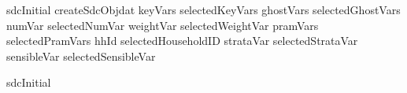 \documentclass[letterpaper,10pt,english]{sphinxmanual}
\begin{document}
\begin{sphinxVerbatim}[commandchars=\\\{\},numbers=left,firstnumber=1,stepnumber=1]
     sdcInitial  createSdcObjdat          
                                                        keyVars      selectedKeyVars
                                                    ghostVars    selectedGhostVars
                                                    numVar       selectedNumVar
                                                    weightVar    selectedWeightVar
                                                    pramVars     selectedPramVars
                                                    hhId         selectedHouseholdID
                                strataVar    selectedStrataVar
                                sensibleVar  selectedSensibleVar

     sdcInitial


\end{sphinxVerbatim}
\end{document}
